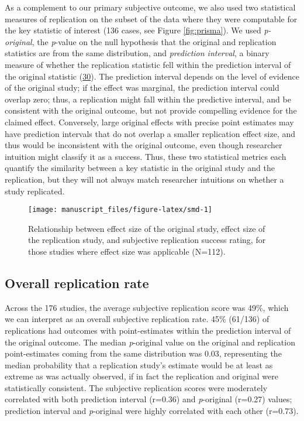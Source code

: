 \documentclass[
  english,
  a4paper,
]{article}
\begin{document}
As a complement to our primary subjective outcome, we also used two statistical measures of replication on the subset of the data where they were computable for the key statistic of interest (136 cases, see Figure \ref{fig:prisma}). We used \emph{p-original}, the \emph{p}-value on the null hypothesis that the original and replication statistics are from the same distribution, and \emph{prediction interval}, a binary measure of whether the replication statistic fell within the prediction interval of the original statistic (\protect\hyperlink{ref-mathur2020}{30}). The prediction interval depends on the level of evidence of the original study; if the effect was marginal, the prediction interval could overlap zero; thus, a replication might fall within the predictive interval, and be consistent with the original outcome, but not provide compelling evidence for the claimed effect. Conversely, large original effects with precise point estimates may have prediction intervals that do not overlap a smaller replication effect size, and thus would be inconsistent with the original outcome, even though researcher intuition might classify it as a success. Thus, these two statistical metrics each quantify the similarity between a key statistic in the original study and the replication, but they will not always match researcher intuitions on whether a study replicated.

\begin{figure}[ht]
\texttt{[image: manuscript\_files/figure-latex/smd-1]} \caption{Relationship between effect size of the original study, effect size of the replication study, and subjective replication success rating, for those studies where effect size was applicable (N=112).}\label{fig:smd}
\end{figure}

\hypertarget{overall-replication-rate}{%
\subsection{Overall replication rate}\label{overall-replication-rate}}

Across the 176 studies, the average subjective replication score was 49\%, which we can interpret as an overall subjective replication rate. 45\% (61/136) of replications had outcomes with point-estimates within the prediction interval of the original outcome. The median \emph{p}-original value on the original and replication point-estimates coming from the same distribution was 0.03, representing the median probability that a replication study's estimate would be at least as extreme as was actually observed, if in fact the replication and original were statistically consistent. The subjective replication scores were moderately correlated with both prediction interval (r=0.36) and \emph{p}-original (r=0.27) values; prediction interval and \emph{p}-original were highly correlated with each other (r=0.73).
\end{document}
